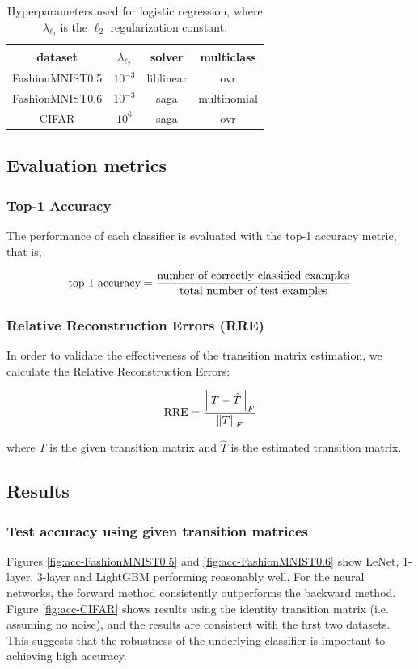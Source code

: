 \documentclass{article} %
\begin{document}
\begin{table}\begin{tabular}{cccc} dataset & $\lambda_{\ell_2}$ & solver & multiclass\\\hline
FashionMNIST0.5 & $10^{-3}$ & liblinear & ovr\\
FashionMNIST0.6 & $10^{-3}$ & saga & multinomial\\
CIFAR & $10^6$ & saga & ovr
\end{tabular}\caption{
  Hyperparameters used for logistic regression, where $\lambda_{\ell_2}$ is the $\ell_2$ regularization constant.
  \label{tab:lr}
}\end{table}

\subsection{Evaluation metrics}
\subsubsection{Top-1 Accuracy}
The performance of each classifier is evaluated with the top-1 accuracy metric, that is,

\begin{equation}
\textup{top-1 accuracy} = \frac{\textup{number of correctly classified examples}}{\textup{total number of test examples}}
\end{equation}

\subsubsection{Relative Reconstruction Errors (RRE)}
In order to validate the effectiveness of the transition matrix estimation, we calculate the Relative Reconstruction Errors:

\begin{equation}
\textup{RRE} = \frac{\left\|T - \hat{T}\right\|_F}{\left\|T\right\|_F}
\end{equation}

where $T$ is the given transition matrix and $\hat{T}$ is the estimated transition matrix.


\subsection{Results}
\subsubsection{Test accuracy using given transition matrices}
Figures \ref{fig:acc-FashionMNIST0.5} and \ref{fig:acc-FashionMNIST0.6} show LeNet, 1-layer, 3-layer and LightGBM performing reasonably well. For the neural networks, the forward method consistently outperforms the backward method. Figure \ref{fig:acc-CIFAR} shows results using the identity transition matrix (i.e. assuming no noise), and the results are consistent with the first two datasets. This suggests that the robustness of the underlying classifier is important to achieving high accuracy.
\end{document}
